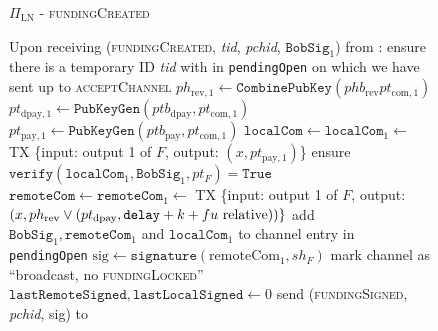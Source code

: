   \begin{figure}[H]
    \begin{protocolbox}{$\Pi_{\mathrm{LN}}$ - \textsc{fundingCreated}}
      \begin{algorithmic}[1]
        \State Upon receiving (\textsc{fundingCreated}, \textit{tid},
        \textit{pchid}, $\mathtt{BobSig}_1$) from \bob:
        \Indent
          \State ensure there is a temporary ID \textit{tid} with \bob{} in
          \texttt{pendingOpen} on which we have sent up to
          \textsc{acceptChannel}
          \State $ph_{\mathrm{rev}, 1} \gets
          \mathtt{CombinePubKey}\left(phb_{\mathrm{rev}} pt_{\mathrm{com},
          1}\right)$
          \State $pt_{\mathrm{dpay}, 1} \gets
          \texttt{PubKeyGen}\left(ptb_{\mathrm{dpay}}, pt_{\mathrm{com},
          1}\right)$
          \State $pt_{\mathrm{pay}, 1} \gets
          \texttt{PubKeyGen}\left(ptb_{\mathrm{pay}}, pt_{\mathrm{com},
          1}\right)$
          \State $\mathtt{localCom} \gets \mathtt{localCom}_1 \gets$ TX \{input:
          output 1 of $F$, output: $\left(x, pt_{\mathrm{pay}, 1}\right)$\}
          \State ensure $\mathtt{verify}\left(\mathtt{localCom}_1,
          \mathtt{BobSig}_1, pt_F\right) = \mathtt{True}$
          \State $\mathtt{remoteCom} \gets \mathtt{remoteCom}_1 \gets$ TX
          \{input: output 1 of $F$, output: $\left(x, ph_{\mathrm{rev}} \vee
          \left(pt_{\mathrm{dpay}}, \mathtt{delay} + k + fu{} \text{
          relative}\right)\right)\}$
          \State add $\mathtt{BobSig}_1, \mathtt{remoteCom}_1$ and
          $\mathtt{localCom}_1$ to channel entry in \texttt{pendingOpen}
          \State $\mathrm{sig} \gets
          \mathtt{signature}\left(\mathrm{remoteCom}_1, sh_F\right)$
          \State mark channel as ``broadcast, no \textsc{fundingLocked}''
          \label{alg:protocol:open:fundingCreated:mark}
          \State $\mathtt{lastRemoteSigned}, \mathtt{lastLocalSigned} \gets 0$
          \State send (\textsc{fundingSigned}, \textit{pchid}, sig) to \bob{}
        \EndIndent
      \end{algorithmic}
    \end{protocolbox}
    \caption{}
    \label{alg:protocol:open:fundingCreated}
  \end{figure}

